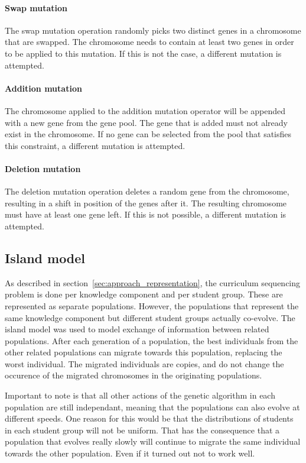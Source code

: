 \paragraph{Swap mutation} The swap mutation operation randomly picks two
distinct genes in a chromosome that are swapped. The chromosome needs to
contain at least two genes in order to be applied to this mutation. If this is
not the case, a different mutation is attempted.

\paragraph{Addition mutation} The chromosome applied to the addition mutation
operator will be appended with a new gene from the gene pool. The gene that is
added must not already exist in the chromosome. If no gene can be selected from
the pool that satisfies this constraint, a different mutation is attempted.

\paragraph{Deletion mutation} The deletion mutation operation deletes a random
gene from the chromosome, resulting in a shift in position of the genes after
it. The resulting chromosome must have at least one gene left. If this is not
possible, a different mutation is attempted.

\subsection{Island model}
\label{sec:approach_island_model}
As described in section~\ref{sec:approach_representation}, the curriculum
sequencing problem is done per knowledge component and per student group. These
are represented as separate populations. However, the populations that
represent the same knowledge component but different student groups actually
co-evolve. The island model was used to model exchange of information between
related populations. After each generation of a population, the best
individuals from the other related populations can migrate towards this
population, replacing the worst individual. The migrated individuals are
copies, and do not change the occurence of the migrated chromosomes in the
originating populations.

Important to note is that all other actions of the genetic algorithm in each
population are still independant, meaning that the populations can also evolve
at different speeds. One reason for this would be that the distributions of
students in each student group will not be uniform. That has the consequence
that a population that evolves really slowly will continue to migrate the same
individual towards the other population. Even if it turned out not to work
well.

